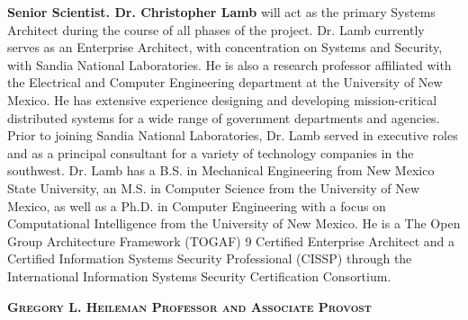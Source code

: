 \documentclass{sbir}
\begin{document}
{{\bf Senior Scientist. Dr. Christopher Lamb} will act as the primary Systems Architect during the course of all phases of the project. Dr. Lamb currently serves as an Enterprise Architect, with concentration on Systems and Security, with Sandia National Laboratories. He is also a research professor affiliated with the Electrical and Computer Engineering department at the University of New Mexico. He has extensive experience designing and developing mission-critical distributed systems for a wide range of government departments and agencies. Prior to joining Sandia National Laboratories, Dr. Lamb served in executive roles and as a principal consultant for a variety of technology companies in the southwest. Dr. Lamb has a B.S. in Mechanical Engineering from New Mexico State University, an M.S. in Computer Science from the University of New Mexico, as well as a Ph.D. in Computer Engineering with a focus on Computational Intelligence from the University of New Mexico. He is a The Open Group Architecture Framework (TOGAF) 9 Certified Enterprise Architect and a Certified Information Systems Security Professional (CISSP) through the International Information Systems Security Certification Consortium.

\textbf{\textsc{Gregory L. Heileman \hfill Professor and Associate Provost}}

}
\end{document}
